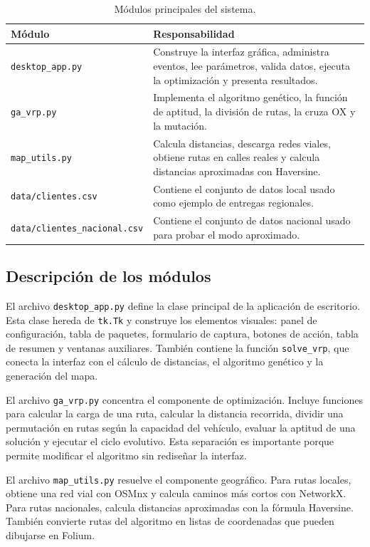 \documentclass[runningheads]{llncs}
\begin{document}
\begin{table}
\centering
\caption{M\'odulos principales del sistema.}\label{tab:modulos}
\begin{tabular}{p{3.2cm}p{8.2cm}}
\toprule
M\'odulo & Responsabilidad \\
\midrule
\texttt{desktop\_app.py} & Construye la interfaz gr\'afica, administra eventos,
lee par\'ametros, valida datos, ejecuta la optimizaci\'on y presenta resultados. \\
\texttt{ga\_vrp.py} & Implementa el algoritmo gen\'etico, la funci\'on de
aptitud, la divisi\'on de rutas, la cruza OX y la mutaci\'on. \\
\texttt{map\_utils.py} & Calcula distancias, descarga redes viales, obtiene
rutas en calles reales y calcula distancias aproximadas con Haversine. \\
\texttt{data/clientes.csv} & Contiene el conjunto de datos local usado como
ejemplo de entregas regionales. \\
\texttt{data/clientes\_nacional.csv} & Contiene el conjunto de datos nacional
usado para probar el modo aproximado. \\
\bottomrule
\end{tabular}
\end{table}

\subsection{Descripci\'on de los m\'odulos}

El archivo \texttt{desktop\_app.py} define la clase principal de la aplicaci\'on
de escritorio. Esta clase hereda de \texttt{tk.Tk} y construye los elementos
visuales: panel de configuraci\'on, tabla de paquetes, formulario de captura,
botones de acci\'on, tabla de resumen y ventanas auxiliares. Tambi\'en contiene la
funci\'on \texttt{solve\_vrp}, que conecta la interfaz con el c\'alculo de
distancias, el algoritmo gen\'etico y la generaci\'on del mapa.

El archivo \texttt{ga\_vrp.py} concentra el componente de optimizaci\'on. Incluye
funciones para calcular la carga de una ruta, calcular la distancia recorrida,
dividir una permutaci\'on en rutas seg\'un la capacidad del veh\'iculo, evaluar la
aptitud de una soluci\'on y ejecutar el ciclo evolutivo. Esta separaci\'on es
importante porque permite modificar el algoritmo sin redise\~nar la interfaz.

El archivo \texttt{map\_utils.py} resuelve el componente geogr\'afico. Para rutas
locales, obtiene una red vial con OSMnx y calcula caminos m\'as cortos con
NetworkX. Para rutas nacionales, calcula distancias aproximadas con la f\'ormula
Haversine. Tambi\'en convierte rutas del algoritmo en listas de coordenadas que
pueden dibujarse en Folium.
\end{document}
